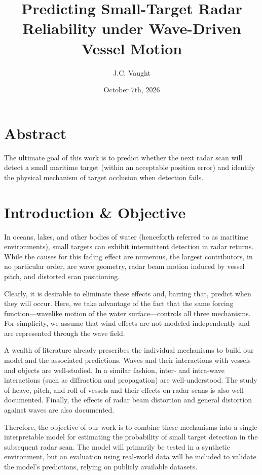\documentclass[10pt,letterpaper]{article}
\title{Predicting Small-Target Radar Reliability under Wave-Driven Vessel Motion}
\author{J.C. Vaught}
\date{October 7th, 2026}
\begin{document}
\maketitle

\section*{Abstract}

The ultimate goal of this work is to predict whether the next radar scan will detect a small maritime target (within an acceptable position error) and identify the physical mechanism of target occlusion when detection fails.

\section{Introduction \& Objective}

In oceans, lakes, and other bodies of water (henceforth referred to as maritime environments), small targets can exhibit intermittent detection in radar returns. While the causes for this fading effect are numerous, the largest contributors, in no particular order, are wave geometry, radar beam motion induced by vessel pitch, and distorted scan positioning.

Clearly, it is desirable to eliminate these effects and, barring that, predict when they will occur. Here, we take advantage of the fact that the same forcing function—wavelike motion of the water surface—controls all three mechanisms. For simplicity, we assume that wind effects are not modeled independently and are represented through the wave field.

A wealth of literature already prescribes the individual mechanisms to build our model and the associated predictions. Waves and their interactions with vessels and objects are well-studied. In a similar fashion, inter- and intra-wave interactions (such as diffraction and propagation) are well-understood. The study of heave, pitch, and roll of vessels and their effects on radar scans is also well documented. Finally, the effects of radar beam distortion and general distortion against waves are also documented.

Therefore, the objective of our work is to combine these mechanisms into a single interpretable model for estimating the probability of small target detection in the subsequent radar scan. The model will primarily be tested in a synthetic environment, but an evaluation using real-world data will be included to validate the model's predictions, relying on publicly available datasets.
\end{document}
